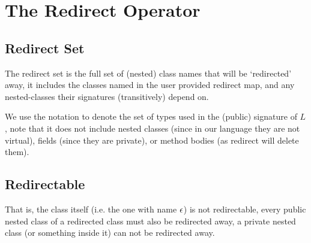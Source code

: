 \section{The Redirect Operator}

\subsection{Redirect Set}
The redirect set is the full set of (nested) class names that will be `redirected' away, it includes the classes named in the user provided redirect map, and any nested-classes their signatures (transitively) depend on.

\begin{defs}
%	
	
\end{defs}

We use the notation  to denote the set of types used in the (public) signature of $L$, note that it does not include nested classes (since in our language they are not virtual),  fields (since they are private), or method bodies (as redirect will delete them).

\subsection{Redirectable}
\begin{defs}
\end{defs}
That is, the class itself (i.e. the one with name $\epsilon$) is not redirectable, every public nested class of a redirected class must also be redirected away, a private nested class (or something inside it) can not be redirected away.


